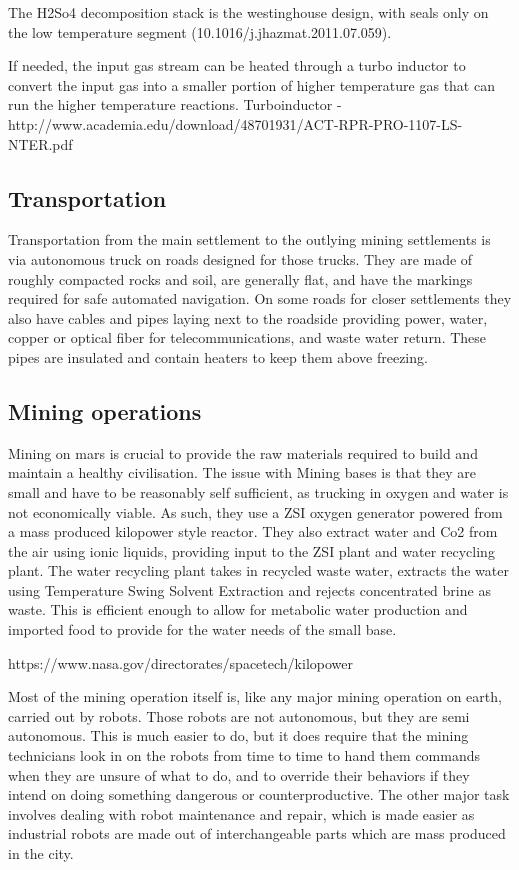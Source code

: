 \documentclass[10pt]{article}
\begin{document}
The H2So4 decomposition stack is the westinghouse design, with seals only on the low temperature segment (10.1016/j.jhazmat.2011.07.059).

If needed, the input gas stream can be heated through a turbo inductor to convert the input gas into a smaller portion of higher temperature gas that can run the higher temperature reactions.
Turboinductor - http://www.academia.edu/download/48701931/ACT-RPR-PRO-1107-LS-NTER.pdf

\subsection{Transportation}
Transportation from the main settlement to the outlying mining settlements is via autonomous truck on roads designed for those trucks. They are made of roughly compacted rocks and soil, are generally flat, and have the markings required for safe automated navigation. On some roads for closer settlements they also have cables and pipes laying next to the roadside providing power, water, copper or optical fiber for telecommunications, and waste water return. These pipes are insulated and contain heaters to keep them above freezing. 

\subsection{Mining operations}
Mining on mars is crucial to provide the raw materials required to build and maintain a healthy civilisation. The issue with Mining bases is that they are small and have to be reasonably self sufficient, as trucking in oxygen and water is not economically viable. As such, they use a ZSI oxygen generator powered from a mass produced kilopower style reactor. They also extract water and Co2 from the air using ionic liquids, providing input to the ZSI plant and water recycling plant. The water recycling plant takes in recycled waste water, extracts the water using Temperature Swing Solvent Extraction and rejects concentrated brine as waste. This is efficient enough to allow for metabolic water production and imported food to provide for the water needs of the small base.

https://www.nasa.gov/directorates/spacetech/kilopower

Most of the mining operation itself is, like any major mining operation on earth, carried out by robots. Those robots are not autonomous, but they are semi autonomous. This is much easier to do, but it does require that the mining technicians look in on the robots from time to time to hand them commands when they are unsure of what to do, and to override their behaviors if they intend on doing something dangerous or counterproductive. The other major task involves dealing with robot maintenance and repair, which is made easier as industrial robots are made out of interchangeable parts which are mass produced in the city. 
\end{document}
